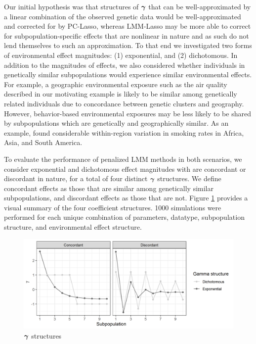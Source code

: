  Our initial hypothesis was that structures of $\boldsymbol{\gamma}$ that can be well-approximated by a linear combination of the observed genetic data would be well-approximated and corrected for by PC-Lasso, whereas LMM-Lasso may be more able to correct for subpopulation-specific effects that are nonlinear in nature and as such do not lend themselves to such an approximation. To that end we investigated two forms of environmental effect magnitudes: (1) exponential, and (2) dichotomous. In addition to the magnitudes of effects, we also considered whether individuals in genetically similar subpopulations would experience similar environmental effects. For example, a geographic environmental exposure such as the air quality described in our motivating example is likely to be similar among genetically related individuals due to concordance between genetic clusters and geography. However, behavior-based environmental exposures may be less likely to be shared by subpopulations which are genetically and geographically similar. As an example, \citet{ng2014smoking} found considerable within-region variation in smoking rates in Africa, Asia, and South America.

 To evaluate the performance of penalized LMM methods in both scenarios, we consider exponential and dichotomous effect magnitudes with are concordant or discordant in nature, for a total of four distinct $\boldsymbol{\gamma}$ structures. We define concordant effects as those that are similar among genetically similar subpopulations, and discordant effects as those that are not. Figure \ref{fig:gamma_structures} provides a visual summary of the four coefficient structures. 1000 simulations were performed for each unique combination of parameters, datatype, subpopulation structure, and environmental effect structure. 
\begin{figure}[H]
    \centering
    \includegraphics[scale = 0.9]{figures/gamma_structure.png}
    \caption{$\boldsymbol{\gamma}$ structures}
    \label{fig:gamma_structures}
\end{figure}

